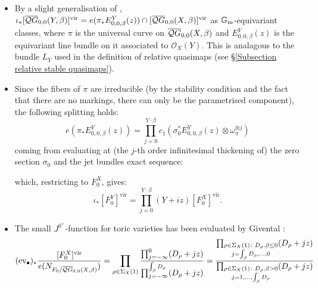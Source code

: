 \begin{center}
\end{center}

\begin{itemize}[leftmargin=*]
 \item By a slight generalisation of \cite[Propositions 6.2.2 and 6.2.3]{CFKM}, $\iota_*[\overline{\mathcal QG}_{0,0}(Y,\beta)]^{\text{vir}}=e(\pi_* E^Y_{0,0,\beta}(z))\cap[\overline{\mathcal QG}_{0,0}(X,\beta)]^{\text{vir}}$ as $\mathbb{G}_{\text{m}}$-equivariant classes, where $\pi$ is the universal curve on $\overline{\mathcal QG}_{0,0}(X,\beta)$ and $E^Y_{0,0,\beta}(z)$ is the equivariant line bundle on it associated to $\mathcal O_X(Y)$. This is analagous to the bundle $L_Y$ used in the definition of relative quasimaps (see \S \ref{Subsection relative stable quasimaps}).
\item Since the fibers of $\pi$ are irreducible (by the stability condition and the fact that there are no markings, there can only be the parametrised component), the following splitting holds:
 \[
  e(\pi_* E^Y_{0,0,\beta}(z))=\prod_{j=0}^{Y\cdot\beta} c_1(\sigma_0^* E^Y_{0,0,\beta}(z)\otimes \omega_{\pi}^{\otimes j})
 \]
coming from evaluating at (the $j$-th order infinitesimal thickening of) the zero section $\sigma_0$ and the jet bundles exact sequence:
\begin{center}
\end{center}
which, restricting to $F_0^X$, gives:
\[
 \iota_*[F_0^Y]^{\text{vir}}=\prod_{j=0}^{Y\cdot\beta}(Y+iz)[F_0^X]^{\text{vir}}.
\]
 \item The small $J^{0^+}$-function for toric varieties has been evaluated by Givental \cite{Givental-equivariantGW}\cite[Definition 7.2.8]{CF-K}:
 \[
  (\operatorname{ev}_{\bullet})_*\frac{[F_0^X]^{\text{vir}}}{e(N_{F_0/\overline{\mathcal QG}_{0,0}(X,\beta)})}=\prod_{\rho\in\Sigma_X(1)}\frac{\prod_{j=-\infty}^0(D_{\rho}+jz)}{\prod_{j=-\infty}^{\int_{\beta}D_{\rho}}(D_\rho+jz)}=\frac{\prod_{\substack{\rho\in\Sigma_X(1)\colon D_\rho.\beta\leq 0 \\ j=\int_{\beta}D_\rho,\ldots,0}}(D_{\rho}+jz)}{\prod_{\substack{\rho\in\Sigma_X(1)\colon D_\rho.\beta> 0 \\ j=1,\ldots,\int_{\beta}D_\rho}}(D_{\rho}+jz)}
\]
\end{itemize}
